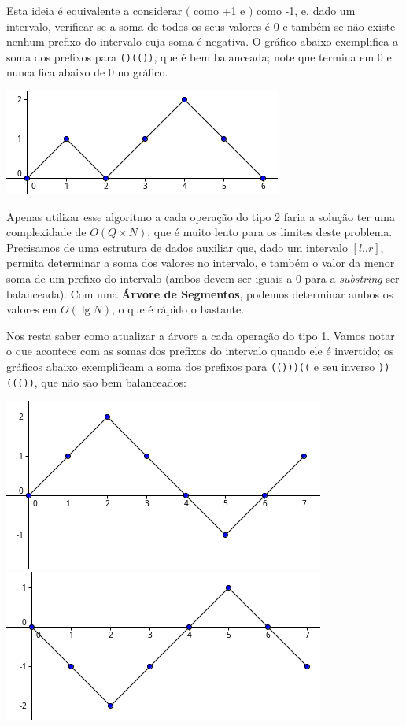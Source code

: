 Esta ideia é equivalente a considerar $($ como +1 e $)$ como -1, e, dado um
intervalo, verificar se a
soma de todos os seus valores é 0 e também se não existe nenhum
prefixo do intervalo cuja soma é
negativa. O gráfico abaixo exemplifica a soma dos prefixos para
\texttt{()(())}, que é bem balanceada; note que termina em 0 e nunca fica abaixo
de 0 no gráfico.

\begin{center}
    \includegraphics[scale=1.9]{graficocerto.png}
\end{center}

Apenas utilizar esse algoritmo a cada operação do
tipo 2 faria a solução ter uma complexidade de $O(Q \times N)$, que é muito
lento para os limites deste problema. Precisamos de uma estrutura de dados
auxiliar que, dado um intervalo $[l..r]$, permita determinar a soma dos valores
no intervalo, e também o valor da menor soma de um prefixo do intervalo (ambos
devem ser iguais a 0 para a \textit{substring} ser balanceada). Com uma
\textbf{Árvore de Segmentos}, podemos determinar ambos os valores em $O(\lg N)$,
    o que é rápido o bastante.

Nos resta saber como atualizar a árvore a cada operação do
tipo 1. Vamos notar o que acontece com as somas dos prefixos do intervalo quando
ele é invertido; os gráficos abaixo exemplificam a soma dos prefixos para
\texttt{(()))((} e seu inverso \texttt{))((())}, que não são bem balanceados:

\begin{center}
    \includegraphics[scale=1.6]{grafico1.png}$ $
    \includegraphics[scale=1.6]{grafico2.png}
\end{center}

